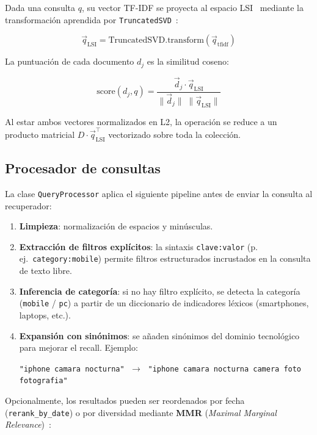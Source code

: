 \documentclass{llncs}
\begin{document}
Dada una consulta $q$, su vector TF-IDF se proyecta al espacio LSI~\cite{deerwester1990}
mediante la transformación aprendida por \texttt{TruncatedSVD}~\cite{pedregosa2011}:

\[
  \vec{q}_\text{LSI} = \text{TruncatedSVD.transform}(\vec{q}_\text{tfidf})
\]

La puntuación de cada documento $d_j$ es la similitud coseno:

\[
  \text{score}(d_j, q)
    = \frac{\vec{d}_j \cdot \vec{q}_\text{LSI}}
           {\|\vec{d}_j\|\;\|\vec{q}_\text{LSI}\|}
\]

Al estar ambos vectores normalizados en L2, la operación se reduce a un
producto matricial $D \cdot \vec{q}_\text{LSI}^\top$ vectorizado sobre toda
la colección.

\subsection{Procesador de consultas}
\label{sec:qp}

La clase \texttt{QueryProcessor} aplica el siguiente pipeline antes de
enviar la consulta al recuperador:

\begin{enumerate}
  \item \textbf{Limpieza}: normalización de espacios y minúsculas.
  \item \textbf{Extracción de filtros explícitos}: la sintaxis
    \texttt{clave:valor} (p.\,ej.\ \texttt{category:mobile}) permite
    filtros estructurados incrustados en la consulta de texto libre.
  \item \textbf{Inferencia de categoría}: si no hay filtro explícito, se
    detecta la categoría (\texttt{mobile} / \texttt{pc}) a partir de un
    diccionario de indicadores léxicos (smartphones, laptops, etc.).
  \item \textbf{Expansión con sinónimos}: se añaden sinónimos del dominio
    tecnológico para mejorar el recall.
    Ejemplo:
    \begin{center}
      \texttt{"iphone camara nocturna"}
      $\;\longrightarrow\;$
      \texttt{"iphone camara nocturna camera foto fotografia"}
    \end{center}
\end{enumerate}

Opcionalmente, los resultados pueden ser reordenados por fecha
(\texttt{rerank\_by\_date}) o por diversidad mediante
\textbf{MMR} (\textit{Maximal Marginal Relevance})~\cite{carbonell1998}:
\end{document}
